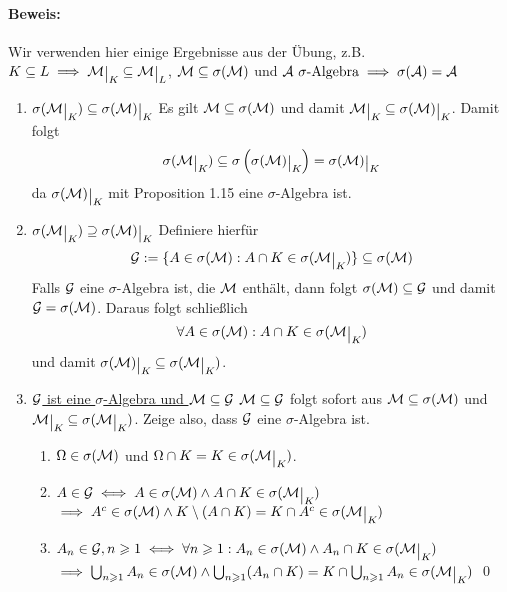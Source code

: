 \paragraph{Beweis:}
Wir verwenden hier einige Ergebnisse aus der \"Ubung, z.B. $K\subseteq L\implies\M\krestr{K}\subseteq\M\krestr{L}$, $\mathcal{M}\subseteq\sigma(\mathcal{M})$ und $\A\ \sigma\text{-Algebra}\implies\sigma(\A)=\A$ 
\begin{enumerate}[label=\Roman*.]
    \item \underline{$\sigma(\M\krestr{K})\subseteq\sigma(\M)\krestr{K}$}\newline
    Es gilt $\mathcal{M}\subseteq\sigma(\mathcal{M})$ und damit $\M\krestr{K}\subseteq\sigma(\M)\krestr{K}$. Damit folgt
    $$\sigma(\M\krestr{K})\subseteq\sigma\left(\sigma(\M)\krestr{K}\right)=\sigma(\M)\krestr{K}$$ 
    da $\sigma(\M)\krestr{K}$ mit Proposition 1.15 eine $\sigma$-Algebra ist.
    
    \item \underline{$\sigma(\M\krestr{K})\supseteq\sigma(\M)\krestr{K}$}\newline
    Definiere hierf\"ur
    $$\G:=\{A\in\sigma(\M):A\cap K\in\sigma(\M\krestr{K})\}\subseteq\sigma(\M)$$
    Falls $\mathcal{G}$ eine $\sigma$-Algebra ist, die $\mathcal{M}$ enth\"alt, dann folgt $\sigma(\mathcal{M})\subseteq\mathcal{G}$ und damit $\mathcal{G}=\sigma(\mathcal{M})$. Daraus folgt schlie\ss{}lich
    $$\forall A\in\sigma(\M):A\cap K\in\sigma(\M\krestr{K})$$
    und damit $\sigma(\M)\krestr{K}\subseteq\sigma(\M\krestr{K})$.
    
    \item \underline{$\mathcal{G}$ ist eine $\sigma$-Algebra und $\mathcal{M}\subseteq\mathcal{G}$}\newline
    $\mathcal{M}\subseteq\mathcal{G}$ folgt sofort aus $\mathcal{M}\subseteq\sigma(\mathcal{M})$ und $\M\krestr{K}\subseteq\sigma(\M\krestr{K})$. Zeige also, dass $\mathcal{G}$ eine $\sigma$-Algebra ist.
    \begin{enumerate}[label=(\roman*)]
        \item $\Omega\in\sigma(\mathcal{M})$ und $\Omega\cap K=K\in\sigma(\M\krestr{K})$.
        \item $A\in\G\iff A\in\sigma(\M)\land A\cap K\in\sigma(\M\krestr{K})$\newline
            $\implies A^c\in\sigma(\M)\land K\setminus(A\cap K)=K\cap A^c\in\sigma(\M\krestr{K})$
        \item $A_n\in\G,n\geq1\iff \forall n\geq1:A_n\in\sigma(\M)\land A_n\cap K\in\sigma(\M\krestr{K})$\newline$\implies\bigcup_{n\geq1}A_n\in\sigma(\M)\land\bigcup_{n\geq1}(A_n\cap K)=K\cap\bigcup_{n\geq1}A_n\in\sigma(\M\krestr{K})$ \qed
    \end{enumerate}
\end{enumerate}